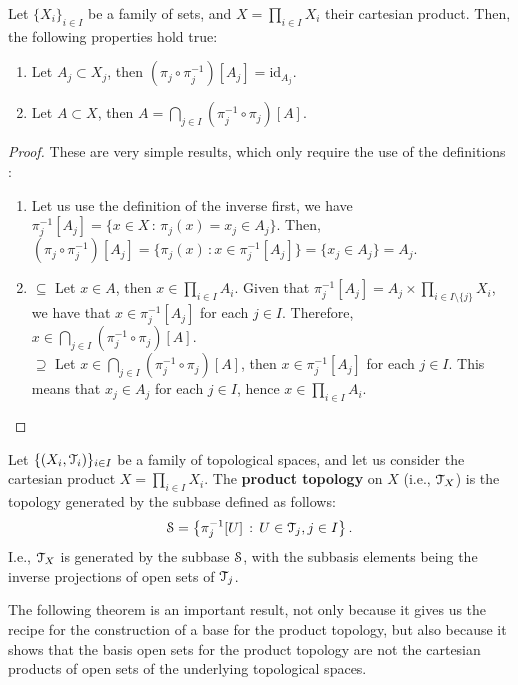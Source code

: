 \begin{lemma}
	\label{lem:projection}
	Let $\{X_i\}_{i\in I}$ be a family of sets, and $X=\prod_{i\in I} X_i$ their cartesian product.
	Then, the following properties hold true:
	\begin{enumerate}
		\item Let $A_j\subset X_j$, then $(\pi_j\circ\pi^{-1}_j)[A_j] = \text{id}_{A_j}$.
		\item Let $A\subset X$, then $A = \bigcap_{j\in I}(\pi_j^{-1}\circ\pi_j)[A]$.
	\end{enumerate}
\end{lemma}
\begin{proof}These are very simple results, which only require the use of the definitions :
	\begin{enumerate}
		\item Let us use the definition of the inverse first, we have $\pi_{j}^{-1}[A_j]=\{ x\in X\,:\,\pi_{j}(x)=x_j\in A_j\}$.
		Then, $(\pi_{j}\circ\pi_{j}^{-1})[A_j]=\{\pi_{j}(x)\,: x\in \pi_{j}^{-1}[A_j]\}=\{x_j\in A_j\} = A_j$.
		\item {$\boxed{\subseteq}$} Let $x\in A$, then $x\in \prod_{i\in I} A_i$. Given that $\pi_j^{-1}[A_j] = A_j\times\prod_{i\in I\setminus\{j\}}X_i$,
		we have that $x\in \pi_j^{-1}[A_j]$ for each $j\in I$. Therefore, $x\in \bigcap_{j\in I}(\pi_j^{-1}\circ\pi_j)[A]$.\\
		{$\boxed{\supseteq}$} Let $x \in \bigcap_{j\in I}(\pi_j^{-1}\circ\pi_j)[A]$, then $x\in \pi_j^{-1}[A_j]$ for each $j\in I$.
		This means that $x_j \in A_j$ for each $j\in I$, hence $x\in \prod_{i\in I} A_i$.
	\end{enumerate}
\end{proof}

\begin{definition}
	\label{def:product-topology}
	Let $\{(X_i, \T_i)\}_{i\in I}$ be a family of topological spaces, and
	let us consider the cartesian product $X=\prod_{i\in I} X_i$.
	The \textbf{product topology} on $X$ (i.e., $\T_{X}$) is the topology generated by the subbase
	defined as follows:
	$$
		\S = \setdef{\pi^{-1}_j[U]}{U\in\T_j, j\in I}.
	$$
	I.e., $\T_X$ is generated by the subbase $\S$, with the subbasis elements
	being the inverse projections of open sets of $\T_j$.
\end{definition}

The following theorem is an important result, not only because it gives us the recipe
for the construction of a base for the product topology, but also because it shows that
the basis open sets for the product topology are not the cartesian products of open sets
of the underlying topological spaces.

